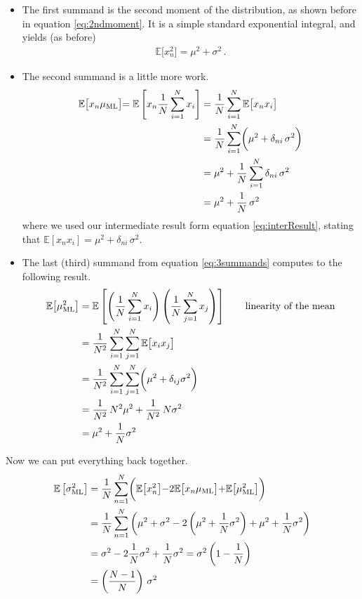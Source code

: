 \documentclass[11pt,DINA4, fleqn]{amsart}
\begin{document}
\begin{itemize}
	
	\item
	The first summand is the second moment of the distribution, as shown before in equation \eqref{eq:2ndmoment}. It is a simple standard exponential integral, and yields (as before)
	\begin{align}
	\mathbb{E}\bigl[x_n^2\bigl] = \mu^2 + \sigma^2 \, .
	\end{align}
	
	\item The second summand is a little more work.
	\begin{align}
	\mathbb{E}\bigl[x_n \mu_{\text{ML}}\bigl] = \mathbb{E}\left[
	x_n \dfrac{1}{N}\sum\displaylimits_{i=1}^{N} x_i
	\right] &=  \dfrac{1}{N} \sum\displaylimits_{i=1}^{N} \mathbb{E}\bigl[x_n x_i\bigl] \\
	&=
	\dfrac{1}{N} \sum\displaylimits_{i=1}^{N}\biggl(\mu^2 + \delta_{ni} \, \sigma ^2 \biggl) \\
	&= \mu^2 + \dfrac{1}{N} \sum\displaylimits_{i=1}^{N} \delta_{ni} \, \sigma^2 \\
	&= \mu^2 + \dfrac{1}{N} \, \sigma^2 \,
	\end{align}
	where we used our intermediate result form equation \eqref{eq:interResult}, stating that $\mathbb{E}[x_n x_i] = \mu^2 + \delta_{ni} \, \sigma^2$.
	
	\item The last (third) summand from equation \eqref{eq:3summands} computes to the following result.
	\begin{align}
	\mathbb{E}\bigl[\mu_{\text{ML}}^2\bigl] &= \mathbb{E} \left[
	\left(\dfrac{1}{N} \sum\displaylimits_{i=1}^{N} x_i\right)
	\left(\dfrac{1}{N} \sum\displaylimits_{j=1}^{N} x_j\right)
	\right] \qquad \text{linearity of the mean}\\
	&= \dfrac{1}{N^2} \sum\displaylimits_{i=1}^{N}\sum\displaylimits_{j=1}^{N}
	\mathbb{E}\bigl[x_i x_j\bigl] \\
	&= \dfrac{1}{N^2} \sum\displaylimits_{i=1}^{N}\sum\displaylimits_{j=1}^{N}
	\biggl(\mu^2 + \delta_{ij} \sigma^2\biggl) \\
	&= \dfrac{1}{N^2}\, N^2\mu^2 + \dfrac{1}{N^2} \, N\sigma^2 \\
	&= \mu^2 + \dfrac{1}{N} \sigma^2
	\end{align}
	
\end{itemize}
Now we can put everything back together.
\begin{align}
\mathbb{E}\left[\sigma^2_{\text{ML}}\right] 
&= \dfrac{1}{N} \sum \displaylimits_{n=1}^{N}
\biggl(
\mathbb{E}\bigl[x_n^2\bigl] - 2 \mathbb{E}\bigl[x_n\mu_{\text{ML}}\bigl]
+ \mathbb{E}\bigl[\mu_{\text{ML}}^2\bigl]
\biggl) \\
&= \dfrac{1}{N} \sum\displaylimits_{n=1}^{N}
\left(
\mu^2 + \sigma^2 - 2\left(\mu^2 + \dfrac{1}{N}\sigma^2\right) + \mu^2 + \dfrac{1}{N} \sigma^2
\right) \\
&=\sigma^2 - 2 \dfrac{1}{N}\sigma^2 + \dfrac{1}{N} \sigma^2 = \sigma^2 \left(1 - \dfrac{1}{N}\right) \\
&= \left(\dfrac{N-1}{N}\right) \, \sigma^2
\end{align}
\end{document}
